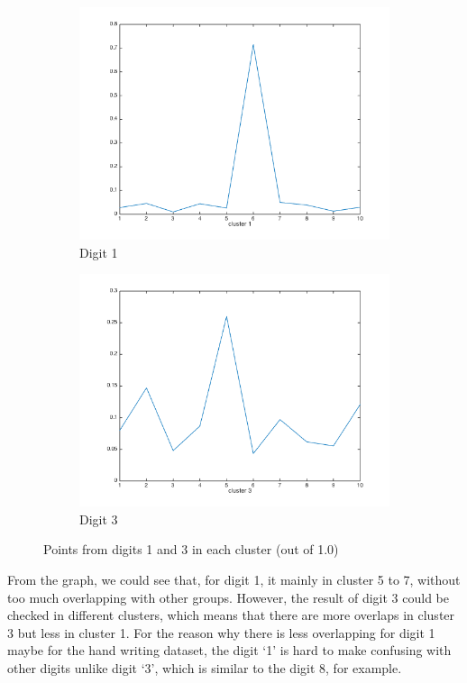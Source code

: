 \documentclass[]{article}
\begin{document}
\begin{figure}[h]
	\centering
	\begin{subfigure}{.49\textwidth}
		\centering
		\includegraphics[width=1\linewidth]{../images-update/2-(3)-(a)-2.png}
		\caption{Digit 1}
		\label{fig:sub1}
	\end{subfigure}
	\begin{subfigure}{.49\textwidth}
		\centering
		\includegraphics[width=1\linewidth]{../images-update/2-(3)-a-1.png}
		\caption{Digit 3}
		\label{fig:sub1}
	\end{subfigure}
	\caption{Points from digits 1 and 3 in each cluster (out of 1.0)}
	\label{fig:1vs3}
\end{figure}
From the graph, we could see that, for digit 1, it mainly in cluster 5 to 7, without too much overlapping with other groups. However, the result of digit 3 could be checked in different clusters, which means that there are more overlaps in cluster 3 but less in cluster 1. For the reason why there is less overlapping for digit 1 maybe for the hand writing dataset, the digit `1' is hard to make confusing with other digits unlike digit `3', which is similar to the digit 8, for example.
 
\end{document}
